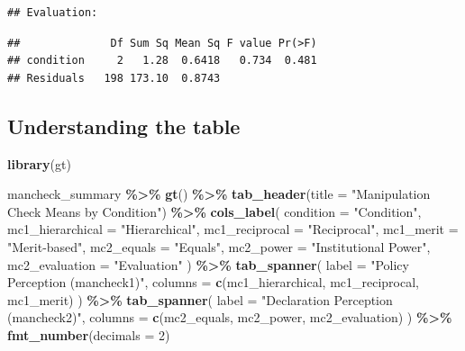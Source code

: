 \documentclass[
]{article}
\newenvironment{Shaded}{\begin{snugshade}}{\end{snugshade}}
\newcommand{\AttributeTok}[1]{\textcolor[rgb]{0.13,0.29,0.53}{#1}}
\newcommand{\DecValTok}[1]{\textcolor[rgb]{0.00,0.00,0.81}{#1}}
\newcommand{\FunctionTok}[1]{\textcolor[rgb]{0.13,0.29,0.53}{\textbf{#1}}}
\newcommand{\NormalTok}[1]{#1}
\newcommand{\SpecialCharTok}[1]{\textcolor[rgb]{0.81,0.36,0.00}{\textbf{#1}}}
\newcommand{\StringTok}[1]{\textcolor[rgb]{0.31,0.60,0.02}{#1}}
\begin{document}
\begin{verbatim}
## Evaluation:
\end{verbatim}

\begin{verbatim}
##              Df Sum Sq Mean Sq F value Pr(>F)
## condition     2   1.28  0.6418   0.734  0.481
## Residuals   198 173.10  0.8743
\end{verbatim}

\subsection{Understanding the table}\label{understanding-the-table}

\begin{Shaded}
\begin{Highlighting}[]
\FunctionTok{library}\NormalTok{(gt)}

\NormalTok{mancheck\_summary }\SpecialCharTok{\%\textgreater{}\%}
  \FunctionTok{gt}\NormalTok{() }\SpecialCharTok{\%\textgreater{}\%}
  \FunctionTok{tab\_header}\NormalTok{(}\AttributeTok{title =} \StringTok{"Manipulation Check Means by Condition"}\NormalTok{) }\SpecialCharTok{\%\textgreater{}\%}
  \FunctionTok{cols\_label}\NormalTok{(}
    \AttributeTok{condition        =} \StringTok{"Condition"}\NormalTok{,}
    \AttributeTok{mc1\_hierarchical =} \StringTok{"Hierarchical"}\NormalTok{,}
    \AttributeTok{mc1\_reciprocal   =} \StringTok{"Reciprocal"}\NormalTok{,}
    \AttributeTok{mc1\_merit        =} \StringTok{"Merit{-}based"}\NormalTok{,}
    \AttributeTok{mc2\_equals       =} \StringTok{"Equals"}\NormalTok{,}
    \AttributeTok{mc2\_power        =} \StringTok{"Institutional Power"}\NormalTok{,}
    \AttributeTok{mc2\_evaluation   =} \StringTok{"Evaluation"}
\NormalTok{  ) }\SpecialCharTok{\%\textgreater{}\%}
  \FunctionTok{tab\_spanner}\NormalTok{(}
    \AttributeTok{label =} \StringTok{"Policy Perception (mancheck1)"}\NormalTok{,}
    \AttributeTok{columns =} \FunctionTok{c}\NormalTok{(mc1\_hierarchical, mc1\_reciprocal, mc1\_merit)}
\NormalTok{  ) }\SpecialCharTok{\%\textgreater{}\%}
  \FunctionTok{tab\_spanner}\NormalTok{(}
    \AttributeTok{label =} \StringTok{"Declaration Perception (mancheck2)"}\NormalTok{,}
    \AttributeTok{columns =} \FunctionTok{c}\NormalTok{(mc2\_equals, mc2\_power, mc2\_evaluation)}
\NormalTok{  ) }\SpecialCharTok{\%\textgreater{}\%}
  \FunctionTok{fmt\_number}\NormalTok{(}\AttributeTok{decimals =} \DecValTok{2}\NormalTok{)}
\end{Highlighting}
\end{Shaded}
\end{document}
